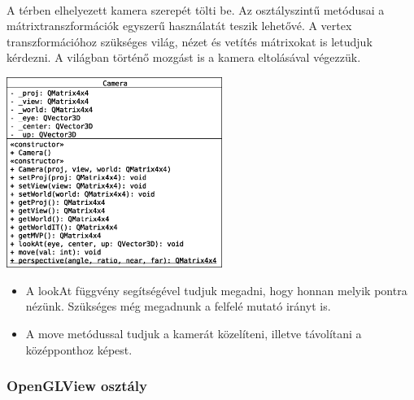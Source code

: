 \documentclass[12pt]{report}
\begin{document}
\paragraph{}
A térben elhelyezett kamera szerepét tölti be. Az osztályszintű metódusai a mátrixtranszformációk egyszerű használatát teszik lehetővé. A vertex transzformációhoz szükséges világ, nézet és vetítés mátrixokat is letudjuk kérdezni. A világban történő mozgást is a kamera eltolásával végezzük.
\begin{center}
\includegraphics[width=7cm]{pics/uml/Camera}
\end{center}
\begin{itemize}
\item A lookAt függvény segítségével tudjuk megadni, hogy honnan melyik pontra nézünk. Szükséges még megadnunk a felfelé mutató irányt is.
\item A move metódussal tudjuk a kamerát közelíteni, illetve távolítani a középponthoz képest.
\end{itemize}

\subsubsection{OpenGLView osztály}
\end{document}
